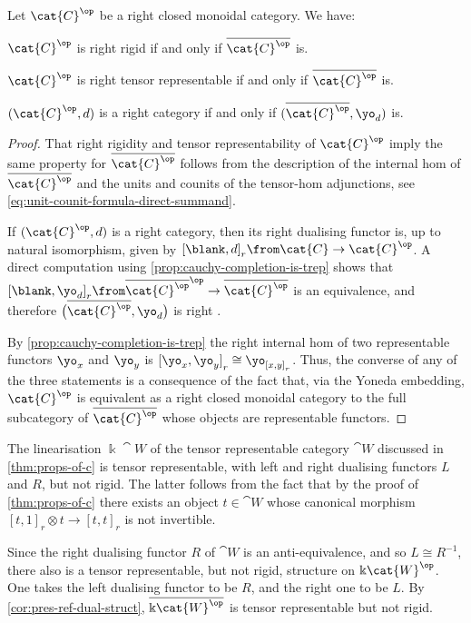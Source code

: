 \begin{corollary}\label{cor:pres-ref-dual-struct}
  Let \(\cat{C}^{\op}\) be a right closed monoidal category.
  We have:
  \begin{thmlist}[noitemsep]
    \item \(\cat{C}^{\op}\) is right rigid if and only if \(\overline{\cat{C}^{\op}}\) is.\label{itm:rigid-implies-rigid}
    \item \(\cat{C}^{\op}\) is right tensor representable if and only if \(\overline{\cat{C}^{\op}}\) is.\label{itm:trep-implies-trep}
    \item \((\cat{C}^{\op}, d)\) is a right \GV{} category if and only if \((\overline{\cat{C}^{\op}}, \yo_{d})\) is.\label{itm:GV-implies-GV}
  \end{thmlist}
\end{corollary}
\begin{proof}
  That right rigidity and tensor representability of \(\cat{C}^{\op}\) imply the same property for \(\overline{\cat{C}^{\op}}\)
  follows from the description of the internal hom of \(\overline{\cat{C}^{\op}}\)
  and the units and counits of the tensor-hom adjunctions,
  see \cref{eq:unit-counit-formula-direct-summand}.

  If \((\cat{C}^{\op}, d)\) is a right \GV{} category,
  then its right dualising functor is, up to natural isomorphism, given by \({[\blank, d]}_r \from\cat{C} \to\cat{C}^{\op}\).
  A direct computation using \cref{prop:cauchy-completion-is-trep} shows that
  \({[\blank, \yo_{d}]}_r \from \overline{\cat{C}^{\op}}^{\op}\to \overline{\cat{C}^{\op}}\) is an equivalence,
  and therefore \(\big(\overline{\cat{C}^{\op}}, \yo_{d}\big)\) is right \GV{}.

  By \cref{prop:cauchy-completion-is-trep} the right internal hom of two representable functors \(\yo_{x}\) and \(\yo_{y}\) is \({[\yo_{x},\yo_{y}]}_r \cong\yo_{{[x,y]}_r}\).
  Thus, the converse of any of the three statements is a consequence of the fact that, via the Yoneda embedding, \(\cat{C}^{\op}\) is equivalent as a right closed monoidal category to the full subcategory of \(\overline{\cat{C}^{\op}}\) whose objects are representable functors.
\end{proof}

\begin{remark}\label{rmk:fgp-is-trep-but-not-rigid}
  The linearisation \(\Bbbk\cat{W}\) of the tensor representable category \(\cat{W}\) discussed in \cref{thm:props-of-c} is tensor representable,
  with left and right dualising functors \(L\) and \(R\),
  but not rigid.
  The latter follows from the fact that by the proof of \cref{thm:props-of-c} there exists an object \(t \in\cat{W}\)
  whose canonical morphism \({[t,1]}_r\otimes t \to {[t,t]}_r\) is not invertible.

  Since the right dualising functor \(R\) of \(\cat{W}\) is an anti\hyp{}equivalence,
  and so \(L \cong R^{-1}\),
  there also is a tensor representable, but not rigid, structure on \(\Bbbk\cat{W}^{\op}\).
  One takes the left dualising functor to be \(R\), and the right one to be \(L\).
  By \cref{cor:pres-ref-dual-struct}, \(\overline{\Bbbk\cat{W}^{\op}}\)
  is tensor representable but not rigid.
\end{remark}

